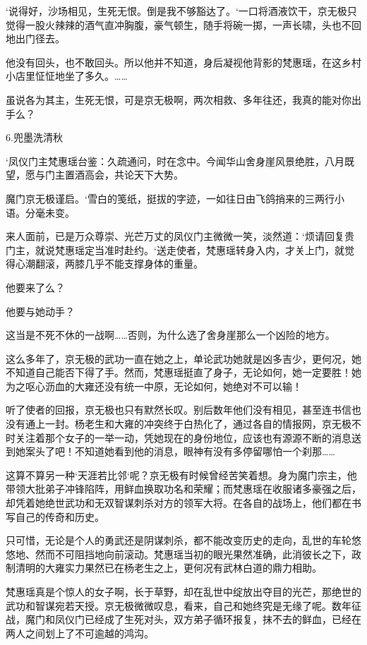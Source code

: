 ‘说得好，沙场相见，生死无恨。倒是我不够豁达了。‘一口将酒液饮干，京无极只觉得一股火辣辣的酒气直冲胸腹，豪气顿生，随手将碗一掷，一声长啸，头也不回地出门径去。

他没有回头，也不敢回头。所以他并不知道，身后凝视他背影的梵惠瑶，在这乡村小店里怔怔地坐了多久。……

虽说各为其主，生死无恨，可是京无极啊，两次相救、多年往还，我真的能对你出手么？

6.兜墨洗清秋

‘凤仪门主梵惠瑶台鉴：久疏通问，时在念中。今闻华山舍身崖风景绝胜，八月既望，愿与门主置酒高会，共论天下大势。

魔门京无极谨启。‘雪白的笺纸，挺拔的字迹，一如往日由飞鸽捎来的三两行小语。分毫未变。

来人面前，已是万众尊崇、光芒万丈的凤仪门主微微一笑，淡然道：‘烦请回复贵门主，就说梵惠瑶定当准时赴约。‘送走使者，梵惠瑶转身入内，才关上门，就觉得心潮翻滚，两膝几乎不能支撑身体的重量。

他要来了么？

他要与她动手？

这当是不死不休的一战啊……否则，为什么选了舍身崖那么一个凶险的地方。

这么多年了，京无极的武功一直在她之上，单论武功她就是凶多吉少，更何况，她不知道自己能否下得了手。然而，梵惠瑶挺直了身子，无论如何，她一定要胜！她为之呕心沥血的大雍还没有统一中原，无论如何，她绝对不可以输！

听了使者的回报，京无极也只有默然长叹。别后数年他们没有相见，甚至连书信也没有通上一封。杨老生和大雍的冲突终于白热化了，通过各自的情报网，京无极不时关注着那个女子的一举一动，凭她现在的身份地位，应该也有源源不断的消息送到她案头了吧！不知道她看到他的消息，眼神有没有多停留哪怕一个刹那……

这算不算另一种‘天涯若比邻‘呢？京无极有时候曾经苦笑着想。身为魔门宗主，他带领大批弟子冲锋陷阵，用鲜血换取功名和荣耀；而梵惠瑶在收服诸多豪强之后，却凭着她绝世武功和无双智谋刺杀对方的领军大将。在各自的战场上，他们都在书写自己的传奇和历史。

只可惜，无论是个人的勇武还是阴谋刺杀，都不能改变历史的走向，乱世的车轮悠悠地、然而不可阻挡地向前滚动。梵惠瑶当初的眼光果然准确，此消彼长之下，政制清明的大雍实力果然已在杨老生之上，更何况有武林白道的鼎力相助。

梵惠瑶真是个惊人的女子啊，长于草野，却在乱世中绽放出夺目的光芒，那绝世的武功和智谋宛若天授。京无极微微叹息，看来，自己和她终究是无缘了呢。数年征战，魔门和凤仪门已经成了生死对头，双方弟子循环报复，抹不去的鲜血，已经在两人之间划上了不可逾越的鸿沟。

